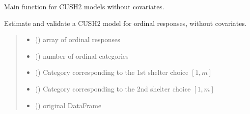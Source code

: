 \documentclass[letterpaper,10pt,english]{sphinxmanual}
\begin{document}

\begin{fulllineitems}
\label{\detokenize{cubmods:cubmods.cush2.mle}}
\pysigstartsignatures
{}
\pysigstopsignatures
\sphinxAtStartPar
Main function for CUSH2 models without covariates.

\sphinxAtStartPar
Estimate and validate a CUSH2 model for ordinal responses, without covariates.
\begin{quote}\begin{description}
\begin{itemize}
\item {} 
\sphinxAtStartPar
{} () \textendash{} array of ordinal responses

\item {} 
\sphinxAtStartPar
{} () \textendash{} number of ordinal categories

\item {} 
\sphinxAtStartPar
{} () \textendash{} Category corresponding to the 1st shelter choice \([1,m]\)

\item {} 
\sphinxAtStartPar
{} () \textendash{} Category corresponding to the 2nd shelter choice \([1,m]\)

\item {} 
\sphinxAtStartPar
{} () \textendash{} original DataFrame


\end{itemize}
\end{description}
\end{quote}
\end{fulllineitems}
\end{document}
